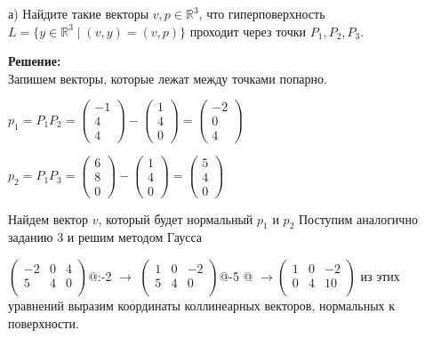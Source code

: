 \documentclass[a4paper,12pt]{article}
\makeatletter
\newcommand*{\rom}[1]{\expandafter\@slowromancap\romannumeral #1@}
\makeatother
\begin{document}
\begin{enumerate}
а) Найдите такие векторы $v, p\in \mathbb R^3$, что гиперповерхность $L = \{y\in \mathbb R^3 \mid (v, y) = (v, p)\}$ проходит через точки $P_1, P_2, P_3$.

\textbf{Решение:}\\
Запишем векторы, которые лежат между точками попарно.

$p_1= P_1P_2 = 
\begin{pmatrix}
{-1}\\{4}\\{4}
\end{pmatrix}-\begin{pmatrix}
{1}\\{4}\\{0}
\end{pmatrix}=\begin{pmatrix}
{-2}\\{0}\\{4}
\end{pmatrix}$

$p_2= P_1P_3 = 
\begin{pmatrix}
{6}\\{8}\\{0}
\end{pmatrix}-\begin{pmatrix}
{1}\\{4}\\{0}
\end{pmatrix}=\begin{pmatrix}
{5}\\{4}\\{0}
\end{pmatrix}$

Найдем вектор $v$, который будет нормальный $p_1$ и $p_2$
Поступим аналогично заданию 3 и решим методом Гаусса

$\begin{pmatrix}
-2&0&4\\
5&4&0\\
\end{pmatrix}$\rom{1}:-2 $\rightarrow$
$\begin{pmatrix}
1&0&-2\\
5&4&0\\
\end{pmatrix}$\rom{2}-5 \rom{2} $\rightarrow$$\begin{pmatrix}
1&0&-2\\
0&4&10\\
\end{pmatrix}$ из этих уравнений выразим координаты коллинеарных векторов, нормальных к поверхности.


\end{enumerate}
\end{document}
